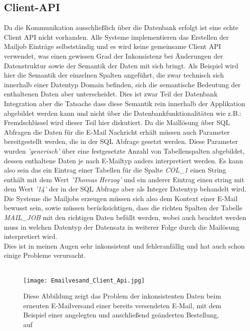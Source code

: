 \subsection{Client-API}
Da die Kommunikation ausschließlich über die Datenbank erfolgt ist eine echte Client API nicht vorhanden. Alle Systeme implementieren das Erstellen der Mailjob Einträge selbstständig und es wird keine gemeinsame Client API verwendet, was einen gewissen Grad der Inkonsistenz bei Änderungen der Datenstruktur sowie der Semantik der Daten mit sich bringt. Als Beispiel wird hier die Semantik der einzelnen Spalten angeführt, die zwar technisch sich innerhalb einer Datentyp Domain befinden, sich die semantische Bedeutung der enthaltenen Daten aber unterscheidet. Dies ist zwar Teil der Datenbank Integration aber die Tatsache dass diese Semantik rein innerhalb der Applikation abgebildet werden kann und nicht über die Datenbankfunktionalitäten wie z.B.: Fremdschlüssel wird dieser Teil hier diskutiert. Da die Maillösung über SQL Abfragen die Daten für die E-Mail Nachricht erhält müssen auch Parameter bereitgestellt werden, die in der SQL Abfrage gesetzt werden. Diese Parameter wurden \emph{'generisch'} über eine festgesetzte Anzahl von Tabellenspalten abgebildet, dessen enthaltene Daten je nach E-Mailtyp anders interpretiert werden. Es kann also sein das ein Eintrag einer Tabellen für die Spalte \emph{COL\_1} einen String enthält mit dem Wert \emph{'Thomas Herzog'} und ein anderer Eintrag einen string mit dem Wert \emph{'14'} der in der SQL Abfrage aber als Integer Datentyp behandelt wird. Die Systeme die Mailjobs erzeugen müssen sich also dem Kontext einer E-Mail bewusst sein, sowie müssen berücksichtigen, dass die richten Spalten der Tabelle \emph{MAIL\_JOB} mit den richtigen Daten befüllt werden, wobei auch beachtet werden muss in welchen Datentyp der Datensatz in weiterer Folge durch die Mailösung interpretiert wird.\\
Dies ist in meinen Augen sehr inkonsistent und fehleranfällig und hat auch schon einige Probleme verursacht.\\\\
\begin{figure}[h]
\centering
\texttt{[image: Emailvesand\_Client\_Api.jpg]}
\caption{Diese Abbildung zeigt das Problem der inkonsistenten Daten beim erneuten E-Mailversand einer bereits versendeten E-Mail, mit dem Beispiel einer angelegten und anschließend geänderten Bestellung, auf}
\label{fig:systemaufbau-alt}
\end{figure}
\newpage



